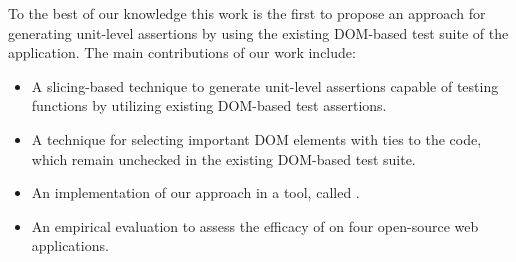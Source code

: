 To the best of our knowledge this work is the first to propose an approach for generating unit-level assertions by using the existing DOM-based test suite of the application. The main contributions of our work include:
\begin{itemize}[noitemsep]
\item A slicing-based technique to generate unit-level assertions capable of testing \javascript functions by utilizing existing DOM-based test assertions.
\item A technique for selecting important DOM elements with ties to the \javascript code, which remain unchecked in the existing DOM-based test suite.
\item An implementation of our approach in a tool, called \tool. 
\item An empirical evaluation to assess the efficacy of \tool on four open-source web applications.
\end{itemize} 